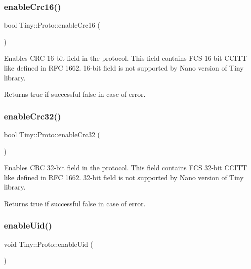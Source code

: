 \subsubsection{\texorpdfstring{enable\+Crc16()}{enableCrc16()}}
{\footnotesize\ttfamily bool Tiny\+::\+Proto\+::enable\+Crc16 (\begin{DoxyParamCaption}{ }\end{DoxyParamCaption})}

Enables C\+RC 16-\/bit field in the protocol. This field contains F\+CS 16-\/bit C\+C\+I\+TT like defined in R\+FC 1662. 16-\/bit field is not supported by Nano version of Tiny library. \begin{DoxyReturn}{Returns}
true if successful false in case of error. 
\end{DoxyReturn}
\mbox{\label{classTiny_1_1Proto_a2ef1c80490d9343b896180ab8b8a6f77}} 
\subsubsection{\texorpdfstring{enable\+Crc32()}{enableCrc32()}}
{\footnotesize\ttfamily bool Tiny\+::\+Proto\+::enable\+Crc32 (\begin{DoxyParamCaption}{ }\end{DoxyParamCaption})}

Enables C\+RC 32-\/bit field in the protocol. This field contains F\+CS 32-\/bit C\+C\+I\+TT like defined in R\+FC 1662. 32-\/bit field is not supported by Nano version of Tiny library. \begin{DoxyReturn}{Returns}
true if successful false in case of error. 
\end{DoxyReturn}
\mbox{\label{classTiny_1_1Proto_a9fdd64b8296e27f3205cd0d3ea685eac}} 
\subsubsection{\texorpdfstring{enable\+Uid()}{enableUid()}}
{\footnotesize\ttfamily void Tiny\+::\+Proto\+::enable\+Uid (\begin{DoxyParamCaption}{ }\end{DoxyParamCaption})\hspace{0.3cm}{\ttfamily [inline]}}

